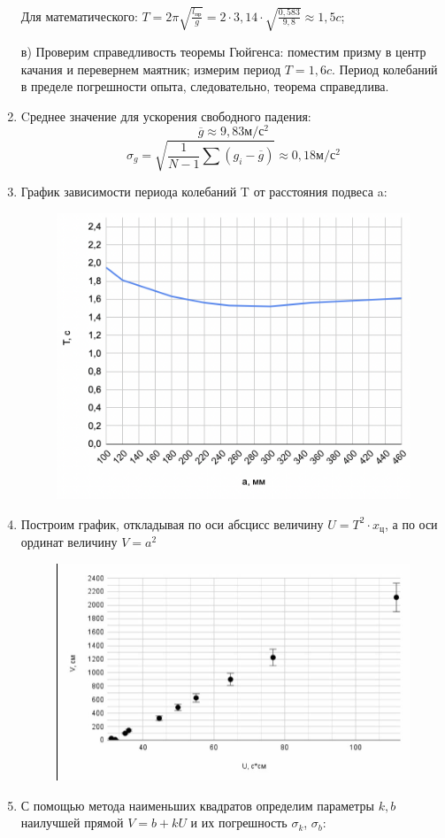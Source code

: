 \documentclass[a4paper,12pt]{article} %
\begin{document}
\begin{enumerate}
Для математического: $T=2\pi\sqrt{\frac{l_{пр}}{g}}= 2\cdot 3,14 \cdot \sqrt{\frac{0,583}{9,8}}\approx 1,5c$;

в) Проверим справедливость теоремы Гюйгенса: поместим призму в центр качания и перевернем маятник; измерим период $T=1,6c$. Период колебаний в пределе погрешности опыта, следовательно, теорема справедлива.



\item Cреднее значение для ускорения свободного падения:
\[\overline{g}\approx 9,83 м/с^2\]
\[\sigma_g = \sqrt{\frac{1}{N-1}\sum{(g_i-\overline{g})}}\approx 0,18 м/с^2\]
\item График зависимости периода колебаний T от расстояния подвеса a:
\begin{figure}[h]
\centering
\includegraphics[width=0.6\linewidth]{График}
\label{fig:mpr}
\end{figure}

\item Построим график, откладывая по оси абсцисс величину $U= T^2\cdot x_ц$, а по оси ординат величину $V=a^2$

\begin{figure}[h]
\centering
\includegraphics[width=0.6\linewidth]{График2}
\label{fig:mpr}
\end{figure}

\newpage
\item С помощью метода наименьших квадратов определим параметры $k, b$ наилучшей прямой $V=b+kU$ и их погрешность $\sigma_k$, $\sigma_b$:


\end{enumerate}
\end{document}
